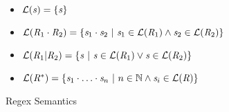 \begin{figure}

\begin{itemize}
\item $\mathcal{L}(\mathit{s})=\{\mathit{s}\}$
\item $\mathcal{L}(\mathit{R}_1\cdot\mathit{R}_2) =
\{\mathit{s}_1\cdot\mathit{s}_2 ~|~ \mathit{s}_1\in\mathcal{L}(\mathit{R}_1) \wedge \mathit{s}_2\in\mathcal{L}(\mathit{R}_2)\}$
\item $\mathcal{L}(\mathit{R}_1|\mathit{R}_2) =
\{\mathit{s} ~|~ \mathit{s}\in\mathcal{L}(\mathit{R}_1) \vee \mathit{s}\in\mathcal{L}(\mathit{R}_2)\}$
\item $\mathcal{L}(\mathit{R}^*) =
\{\mathit{s}_1\cdot\ldots\cdot\mathit{s}_n ~|~ n\in\mathbb{N} \wedge \mathit{s}_i\in\mathcal{L}(\mathit{R})\}$

\end{itemize}
\caption{Regex Semantics }
\label{fig:regex-semantics}
\end{figure}
